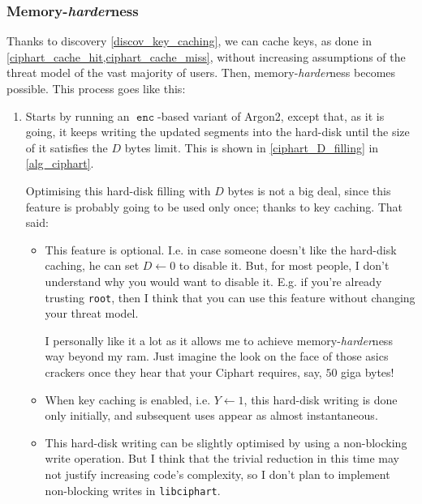 \documentclass[twocolumn]{article}
\DeclareMathOperator{\enc}{\mathtt{enc}}
\begin{document}
\subsubsection{Memory-\emph{harder}ness}
Thanks to discovery \ref{discov_key_caching}, we can cache keys, as done in
\cref{ciphart_cache_hit,ciphart_cache_miss}, without increasing assumptions
of the threat model of the vast majority of users.  Then,
memory-\emph{harder}ness becomes possible.  This process goes like this:
\begin{enumerate}
    \item Starts by running an $\enc$-based variant of Argon2,
    except that, as it is going, it keeps writing the updated segments into
    the hard-disk until the size of it satisfies the $D$ bytes limit.  This
    is shown in \cref{ciphart_D_filling} in \cref{alg_ciphart}.

    Optimising this hard-disk filling with $D$ bytes is not a big deal,
    since this feature is probably going to be used only once; thanks to
    key caching.  That said:
    \begin{itemize}
        \item This feature is optional.  I.e. in case someone doesn't like
        the hard-disk caching, he can set $D \gets 0$ to disable it.  But,
        for most people, I don't understand why you would want to disable
        it.  E.g. if you're already trusting \texttt{root}, then I think
        that you can use this feature without changing your threat model.

        I personally like it a lot as it allows me to achieve
        memory-\emph{harder}ness way beyond my \gls{ram}.  Just imagine the
        look on the face of those \glspl{asic} crackers once they hear that
        your Ciphart requires, say, $50$ giga bytes!

        \item When key caching is enabled, i.e. $Y \gets 1$, this hard-disk
        writing is done only initially, and subsequent uses appear as
        almost instantaneous.

        \item This hard-disk writing can be slightly optimised by using a
        non-blocking write operation.  But I think that the trivial
        reduction in this time may not justify increasing code's
        complexity, so I don't plan to implement non-blocking writes in
        \texttt{libciphart}.
    \end{itemize}


\end{enumerate}
\end{document}
